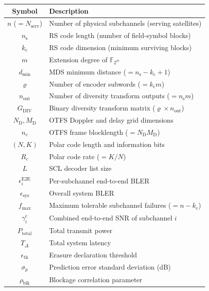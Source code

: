 \begin{center}
{\color{blue}
\begin{tabular}{@{}cl@{}}
\toprule
\textbf{Symbol} & \textbf{Description} \\
\midrule
$n$ ($= N_{\text{serv}}$) & Number of physical subchannels (serving satellites) \\
$n_{\mathrm{s}}$ & RS code length (number of field-symbol blocks) \\
$k_{\mathrm{c}}$ & RS code dimension (minimum surviving blocks) \\
$m$ & Extension degree of $\mathbb{F}_{2^m}$ \\
$d_{\min}$ & MDS minimum distance ($= n_{\mathrm{s}} - k_{\mathrm{c}} + 1$) \\
$\varrho$ & Number of encoder subwords ($= k_{\mathrm{c}} m$) \\
$n_{\text{out}}$ & Number of diversity transform outputs ($= n_{\mathrm{s}} m$) \\
$G_{\mathrm{DIV}}$ & Binary diversity transform matrix ($\varrho \times n_{\text{out}}$) \\
$N_{\mathrm{D}}, M_{\mathrm{D}}$ & OTFS Doppler and delay grid dimensions \\
$n_c$ & OTFS frame blocklength ($= N_{\mathrm{D}} M_{\mathrm{D}}$) \\
$(N, K)$ & Polar code length and information bits \\
$R_c$ & Polar code rate ($= K/N$) \\
$L$ & SCL decoder list size \\
$\epsilon_i^{\mathrm{E2E}}$ & Per-subchannel end-to-end BLER \\
$\epsilon_{\mathrm{sys}}$ & Overall system BLER \\
$f_{\max}$ & Maximum tolerable subchannel failures ($= n - k_{\mathrm{c}}$) \\
$\gamma_i^{\mathrm{c}}$ & Combined end-to-end SNR of subchannel $i$ \\
$P_{\mathrm{total}}$ & Total transmit power \\
$T_{\Delta}$ & Total system latency \\
$\epsilon_{\mathrm{th}}$ & Erasure declaration threshold \\
$\sigma_p$ & Prediction error standard deviation (dB) \\
$\rho_{\mathrm{blk}}$ & Blockage correlation parameter \\
\bottomrule
\end{tabular}
}
\end{center}

